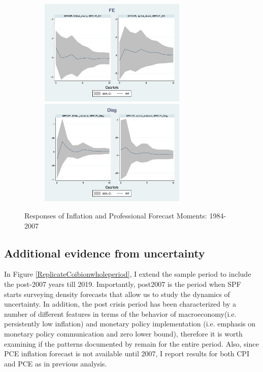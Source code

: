 \documentclass[]{article}
\begin{document}
\begin{figure}[ht]
\begin{subfigure}[b]{0.5\textwidth}
		\smallskip
		\includegraphics[width=7cm]{figures/SPFFE_ashocks_before2007.png} 
		\smallskip
		\includegraphics[width=7cm]{figures/SPFDisg_ab_ashocks_before2007.png} 
	\end{subfigure}
		\caption{Responses of Inflation and Professional Forecast Moments: 1984-2007}
		\label{ReplicateCoibionBefore2007}
	\end{figure}
	
	
	\subsection{Additional evidence from uncertainty}
	
	In Figure \ref{ReplicateCoibionwholeperiod}, I extend the sample period to include the post-2007 years till 2019. Importantly, post2007 is the period when SPF starts surveying density forecasts that allow us to study the dynamics of uncertainty. In addition, the post crisis period has been characterized by a number of different features in terms of the behavior of macroeconomy(i.e. persistently low inflation) and monetary policy implementation (i.e. emphasis on monetary policy communication and zero lower bound), therefore it is worth examining if the patterns documented by \cite{coibion2012can} remain for the entire period. Also, since PCE inflation forecast is not available until 2007, I report results for both CPI and PCE as in previous analysis. 
	
\end{document}
